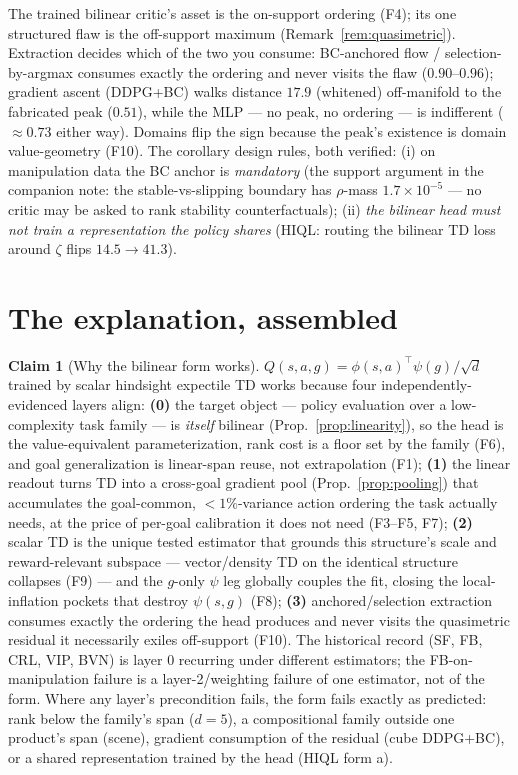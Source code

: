 \documentclass[11pt]{article}
\theoremstyle{definition}
\newtheorem{claim}{Claim}
\theoremstyle{remark}
\begin{document}
The trained bilinear critic's asset is the on-support ordering (F4); its one structured flaw
is the off-support maximum (Remark~\ref{rem:quasimetric}). Extraction decides which of the
two you consume: BC-anchored flow / selection-by-argmax consumes exactly the ordering and
never visits the flaw ($0.90$--$0.96$); gradient ascent (DDPG+BC) walks distance
$17.9$ (whitened) off-manifold to the fabricated peak ($0.51$), while the MLP --- no peak,
no ordering --- is indifferent ($\approx0.73$ either way). Domains flip the sign because the
peak's existence is domain value-geometry (F10). The corollary design rules, both verified:
(i) on manipulation data the BC anchor is \emph{mandatory} (the support argument in the
companion note: the stable-vs-slipping boundary has $\rho$-mass $1.7\times10^{-5}$ --- no
critic may be asked to rank stability counterfactuals); (ii) \emph{the bilinear head must
not train a representation the policy shares} (HIQL: routing the bilinear TD loss around
$\zeta$ flips $14.5\to41.3$).

\section{The explanation, assembled}\label{sec:assembled}

\begin{claim}[Why the bilinear form works]\label{claim:final}
$Q(s,a,g)=\phi(s,a)^\top\psi(g)/\sqrt d$ trained by scalar hindsight expectile TD works
because four independently-evidenced layers align:
\textbf{(0)} the target object --- policy evaluation over a low-complexity task family ---
is \emph{itself} bilinear (Prop.~\ref{prop:linearity}), so the head is the value-equivalent
parameterization, rank cost is a floor set by the family (F6), and goal generalization is
linear-span reuse, not extrapolation (F1);
\textbf{(1)} the linear readout turns TD into a cross-goal gradient pool
(Prop.~\ref{prop:pooling}) that accumulates the goal-common, $<1\%$-variance action
ordering the task actually needs, at the price of per-goal calibration it does not need
(F3--F5, F7);
\textbf{(2)} scalar TD is the unique tested estimator that grounds this structure's scale
and reward-relevant subspace --- vector/density TD on the identical structure collapses
(F9) --- and the $g$-only $\psi$ leg globally couples the fit, closing the local-inflation
pockets that destroy $\psi(s,g)$ (F8);
\textbf{(3)} anchored/selection extraction consumes exactly the ordering the head produces
and never visits the quasimetric residual it necessarily exiles off-support
(F10). The historical record (SF, FB, CRL, VIP, BVN) is layer 0 recurring under different
estimators; the FB-on-manipulation failure is a layer-2/weighting failure of one estimator,
not of the form. Where any layer's precondition fails, the form fails exactly as predicted:
rank below the family's span ($d{=}5$), a compositional family outside one product's span
(scene), gradient consumption of the residual (cube DDPG+BC), or a shared representation
trained by the head (HIQL form a).
\end{claim}
\end{document}
